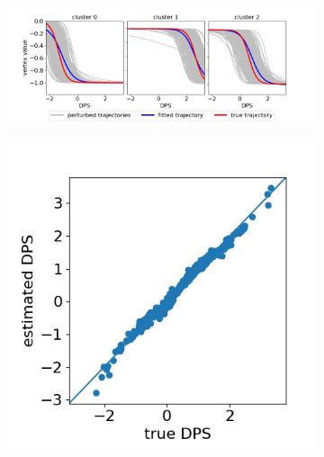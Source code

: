 \begin{figure}
\centering
\begin{subfigure}[b]{0.7\textwidth}
\includegraphics[width=1\textwidth,trim=30 0 60 0,clip]{images/initk-meansCl3Pr1Ra1_VWDPMMean/synThetaRes_initk-meansCl3Pr1Ra1_VWDPMMean.png}
\caption{}
\label{diveResSynthA}
\end{subfigure}
\begin{subfigure}[b]{0.25\textwidth}
\includegraphics[width=1\textwidth,trim=0 0 0 0,clip]{images/initk-meansCl3Pr1Ra1_VWDPMMean/synShiftsRes_initk-meansCl3Pr1Ra1_VWDPMMean.png}
\vspace{0.4em}
\caption{}
\label{diveResSynthB}
\end{subfigure}
\begin{subfigure}[b]{0.32\textwidth}

\end{subfigure}
\end{figure}
